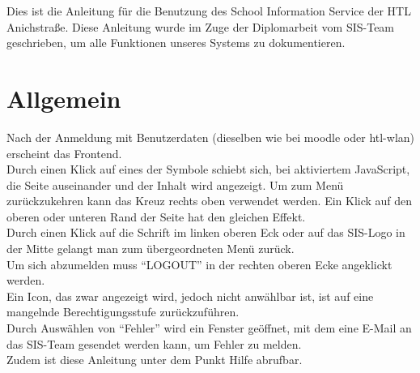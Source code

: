 Dies ist die Anleitung für die Benutzung des School Information Service der HTL Anichstraße. Diese Anleitung wurde im Zuge der Diplomarbeit vom SIS-Team geschrieben, um alle Funktionen unseres Systems zu dokumentieren.

\section{Allgemein}
Nach der Anmeldung mit Benutzerdaten (dieselben wie bei moodle oder htl-wlan) erscheint das Frontend. \\
Durch einen Klick auf eines der Symbole schiebt sich, bei aktiviertem JavaScript, die Seite auseinander und der Inhalt wird angezeigt. Um zum Menü zurückzukehren kann  das Kreuz rechts oben verwendet werden. Ein Klick auf den oberen oder unteren Rand der Seite hat den gleichen Effekt.\\
Durch einen Klick auf die Schrift im linken oberen Eck oder auf das SIS-Logo in der Mitte gelangt man zum übergeordneten Menü zurück.\\
Um sich abzumelden muss \enquote{LOGOUT} in der rechten oberen Ecke angeklickt werden.\\
Ein Icon, das zwar angezeigt wird, jedoch nicht anwählbar ist, ist auf eine mangelnde Berechtigungsstufe zurückzuführen.\\
Durch Auswählen von \enquote{Fehler} wird ein Fenster geöffnet, mit dem eine E-Mail an das SIS-Team gesendet werden kann, um Fehler zu melden.\\
Zudem ist diese Anleitung unter dem Punkt Hilfe abrufbar.